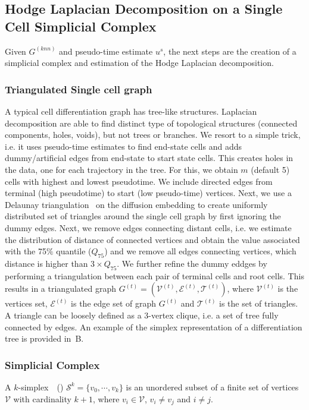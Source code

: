 \subsection{Hodge Laplacian Decomposition on a Single Cell Simplicial Complex}

Given $G^{(knn)}$ and pseudo-time estimate $u^s$, the next steps are the creation of a simplicial complex and estimation of the Hodge Laplacian decomposition.

\subsubsection{Triangulated Single cell graph}

A typical cell differentiation graph has tree-like structures. Laplacian decomposition are able to find distinct type of topological structures (connected components, holes, voids), but not trees or branches. We resort to a simple trick, i.e. it uses pseudo-time estimates to find end-state cells and adds dummy/artificial edges from end-state to start state cells.  This creates holes in the data, one for each trajectory in the tree. For this, we obtain $m$ (default 5) cells with highest and lowest pseudotime. We include directed edges from terminal (high pseudotime) to start (low pseudo-time) vertices. Next, we use a Delaunay triangulation~\citep{delaunay1934bulletin} on the diffusion embedding to create uniformly distributed set of triangles around the single cell graph by first ignoring the dummy edges. Next, we remove edges connecting distant cells, i.e. we estimate the distribution of distance of connected vertices and obtain the value associated with the 75$\%$ quantile ($Q_{75}$) and we remove all edges connecting vertices, which distance is higher than $3\times Q_{75}$. We further refine the dummy eddges by performing a triangulation between each pair of terminal cells and root cells. This results in a triangulated graph $G^{(t)} = (\mathcal{V}^{(t)},\mathcal{E}^{(t)},\mathcal{T}^{(t)})$, where $\mathcal{V}^{(t)}$ is the vertices set, $\mathcal{E}^{(t)}$ is the edge set of graph $G^{(t)}$ and $\mathcal{T}^{(t)}$ is the set of triangles. A triangle can be loosely defined as a 3-vertex clique, i.e. a set of tree fully connected by edges. An example of the simplex representation of a differentiation tree is provided in~B.


\subsubsection{Simplicial Complex}
A $k$-simplex~\citep{schaub2021signal}~() $\mathcal{S}^k = \{{v}_0,\cdots,{v}_k \}$ is an unordered subset of a finite set of vertices $\mathcal{V}$ with cardinality $k + 1$, where $v_i\in \mathcal{V}$, $v_i \neq v_j$ and $i \neq j$.


